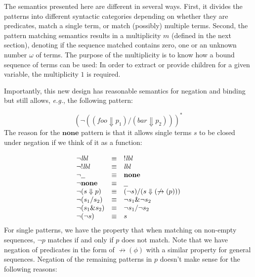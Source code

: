 \documentclass{article}
\newcommand{\lbl}{\ensuremath{\mathit{lbl}}}
\newcommand{\por}[2]{\ensuremath{#1/#2}}
\newcommand{\pand}[2]{\ensuremath{#1\&#2}}
\newcommand{\children}[2]{\ensuremath{#1} \Downarrow #2}
\newcommand{\pnot}[1]{\ensuremath{\lnot #1}}
\newcommand{\many}[1]{\ensuremath{#1^*}}
\newcommand{\any}{\ensuremath{\text{\underline{\hspace{0.6em}}}}}
\newcommand{\none}{\ensuremath{\mathbf{none}}}
\newcommand{\nfb}[1]{\ensuremath{\not\rightarrow(#1)}}
\begin{document}
%
The semantics presented here are different in several ways. First,
it divides the patterns into different syntactic categories
depending on whether they are predicates, match a single term, or
match (possibly) multiple terms. Second, the pattern matching
semantics results in a multiplicity $m$ (defined in the next
section), denoting if the sequence matched contains zero, one or
an unknown number $\omega$ of terms.
%
The purpose of the multiplicity is to know how a bound sequence of
terms can be used: In order to extract or provide children for a
given variable, the multiplicity $1$ is required.

Importantly, this new design has reasonable semantics for negation
and binding but still allows, \emph{e.g.}, the following pattern:

\[
\many{(\pnot{(\por{(\children{\textit{foo}}{p_1})}{(\children{\textit{bar}}{p_2})})})}
\]
%
%
The reason for the \none{} pattern is that it allows single terms
$s$ to be closed under negation if we think of it as a function:

\[
  \begin{array}{lcl}
    \pnot{\lbl}              & \equiv & !\lbl\\
    \pnot{!\lbl}             & \equiv & \lbl\\
    \pnot{\any}              & \equiv & \none{}\\
    \pnot{\none}             & \equiv & \any{}\\
    \pnot{(\children{s}{p})} & \equiv & \por{(\pnot s)}{(\children{s}{(\nfb{p})})}\\
    \pnot{(\por{s_1}{s_2})}  & \equiv & \pand{\pnot s_1}{\pnot s_2}\\
    \pnot{(\pand{s_1}{s_2})} & \equiv & \por{\pnot s_1}{\pnot s_2}\\
    \pnot(\pnot{s})          & \equiv & s\\
  \end{array}
\]
%
For single patterns, we have the property that when matching on
non-empty sequences, $\pnot{p}$ matches if and only if $p$ does
not match.
%
Note that we have negation of predicates in the form of
$\nfb{\phi}$ with a similar property for general sequences.
%
Negation of the remaining patterns in $p$ doesn't
make sense for the following reasons:
\end{document}
